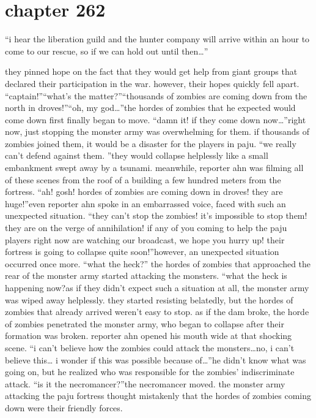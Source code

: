 \section{chapter 262}

                            “i hear the liberation guild and the hunter company will arrive within an hour to come to our rescue, so if we can hold out until then…”




they pinned hope on the fact that they would get help from giant groups that declared their participation in the war.
 however, their hopes quickly fell apart.
“captain!”“what’s the matter?”“thousands of zombies are coming down from the north in droves!”“oh, my god…”the hordes of zombies that he expected would come down first finally began to move.
“damn it! if they come down now…”right now, just stopping the monster army was overwhelming for them.
 if thousands of zombies joined them, it would be a disaster for the players in paju.
“we really can’t defend against them.
”they would collapse helplessly like a small embankment swept away by a tsunami.
meanwhile, reporter ahn was filming all of these scenes from the roof of a building a few hundred meters from the fortress.
“ah! gosh! hordes of zombies are coming down in droves! they are huge!”even reporter ahn spoke in an embarrassed voice, faced with such an unexpected situation.
“they can’t stop the zombies! it’s impossible to stop them! they are on the verge of annihilation! if any of you coming to help the paju players right now are watching our broadcast, we hope you hurry up! their fortress is going to collapse quite soon!”however, an unexpected situation occurred once more.
“what the heck?”
the hordes of zombies that approached the rear of the monster army started attacking the monsters.
“what the heck is happening now?as if they didn’t expect such a situation at all, the monster army was wiped away helplessly.
 they started resisting belatedly, but the hordes of zombies that already arrived weren’t easy to stop.
as if the dam broke, the horde of zombies penetrated the monster army, who began to collapse after their formation was broken.
reporter ahn opened his mouth wide at that shocking scene.
“i can’t believe how the zombies could attack the monsters…no, i can’t believe this… i wonder if this was possible because of…”he didn’t know what was going on, but he realized who was responsible for the zombies’ indiscriminate attack.
“is it the necromancer?”the necromancer moved.
the monster army attacking the paju fortress thought mistakenly that the hordes of zombies coming down were their friendly forces.
